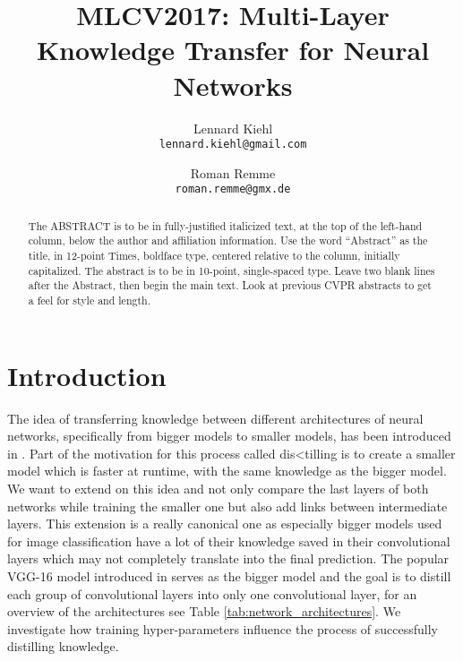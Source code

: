 \documentclass[10pt,twocolumn,letterpaper]{article}
\begin{document}
\title{MLCV2017: Multi-Layer Knowledge Transfer for Neural Networks}

\author{Lennard Kiehl\\
{\tt\small lennard.kiehl@gmail.com}
\and
Roman Remme\\
{\tt\small roman.remme@gmx.de}
}

\maketitle

\begin{abstract}
   The ABSTRACT is to be in fully-justified italicized text, at the top
   of the left-hand column, below the author and affiliation
   information. Use the word ``Abstract'' as the title, in 12-point
   Times, boldface type, centered relative to the column, initially
   capitalized. The abstract is to be in 10-point, single-spaced type.
   Leave two blank lines after the Abstract, then begin the main text.
   Look at previous CVPR abstracts to get a feel for style and length.
\end{abstract}

\section{Introduction}

The idea of transferring knowledge between different architectures of neural networks, specifically from bigger models to smaller models, has been introduced in \cite{hinton2015distilling}. Part of the motivation for this process called dis<tilling is to create a smaller model which is faster at runtime, with the same knowledge as the bigger model. We want to extend on this idea and not only compare the last layers of both networks while training the smaller one but also add links between intermediate layers. This extension is a really canonical one as especially bigger models used for image classification have a lot of their knowledge saved in their convolutional layers which may not completely translate into the final prediction. The popular VGG-16 model introduced in \cite{DBLP:journals/corr/SimonyanZ14a} serves as the bigger model and the goal is to distill each group of convolutional layers into only one convolutional layer, for an overview of the architectures see Table \ref{tab:network_architectures}. We investigate how training hyper-parameters influence the process of successfully distilling knowledge.
\end{document}
